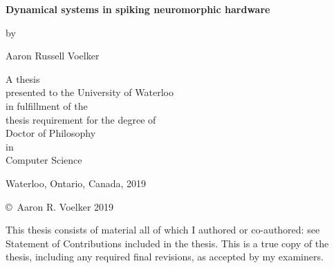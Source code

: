 \pagestyle{empty}

\begin{titlepage}
  \begin{center}
    \vspace*{1.0cm}

    \Huge
    {\bf Dynamical systems in spiking neuromorphic hardware}

    \vspace*{1.0cm}

    \normalsize
    by \\

    \vspace*{1.0cm}

    \Large
    Aaron Russell Voelker \\

    \vspace*{3.0cm}

    \normalsize
    A thesis \\
    presented to the University of Waterloo \\
    in fulfillment of the \\
    thesis requirement for the degree of \\
    Doctor of Philosophy \\
    in \\
    Computer Science \\

    \vspace*{2.0cm}

    Waterloo, Ontario, Canada, 2019 \\

    \vspace*{1.0cm}

    \copyright\ Aaron R. Voelker 2019 \\
  \end{center}
\end{titlepage}

\pagestyle{plain}
\setcounter{page}{2}

\cleardoublepage
{}
{}

\noindent
This thesis consists of material all of which I authored or co-authored: see Statement of Contributions included in the thesis. This is a true copy of the thesis, including any required final revisions, as accepted by my examiners.

